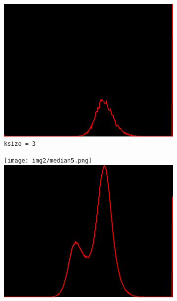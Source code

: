 \begin{figure}[H]
\begin{subfigure}[b]{0.24\textwidth}
        \includegraphics[width=\textwidth]{img2/hist_rect_3_median_3_final_img2.png}
        \caption{\lstinline|ksize = 3|}
        \label{fig:img2_kernel3}
    \end{subfigure}
    \begin{subfigure}[b]{0.24\textwidth}
        \texttt{[image: img2/median5.png]}\\[0.1cm]
        \includegraphics[width=\textwidth]{img2/hist_5_median_5_final_img2.png}
        \begin{center}
        	\text{ }
        \end{center}

\end{subfigure}
\end{figure}
